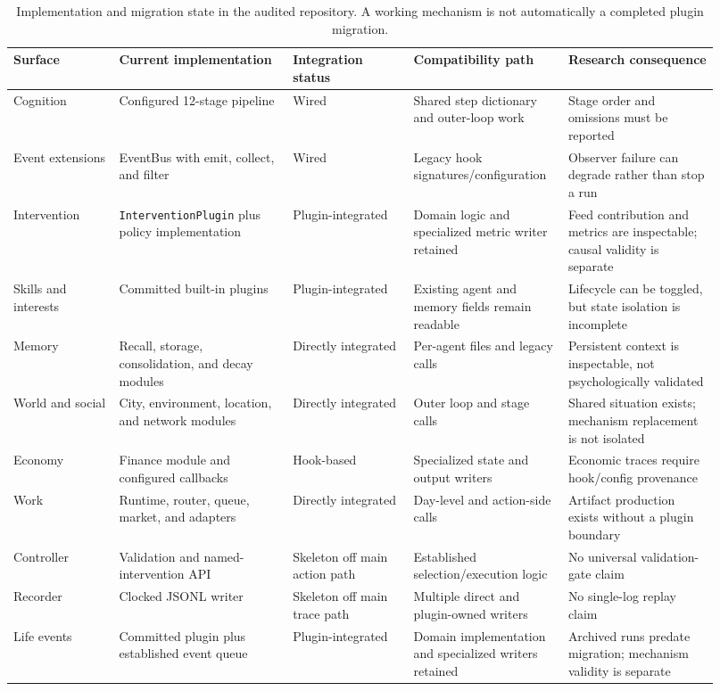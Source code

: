 \begin{table}[t]
\centering
\small
\setlength{\tabcolsep}{4pt}
\begin{tabular}{@{}p{0.14\linewidth}p{0.23\linewidth}p{0.16\linewidth}p{0.19\linewidth}p{0.20\linewidth}@{}}
\toprule
Surface & Current implementation & Integration status & Compatibility path & Research consequence \\
\midrule
Cognition & Configured 12-stage pipeline & Wired & Shared step dictionary and outer-loop work & Stage order and omissions must be reported \\
Event extensions & EventBus with emit, collect, and filter & Wired & Legacy hook signatures/configuration & Observer failure can degrade rather than stop a run \\
Intervention & \texttt{InterventionPlugin} plus policy implementation & Plugin-integrated & Domain logic and specialized metric writer retained & Feed contribution and metrics are inspectable; causal validity is separate \\
Skills and interests & Committed built-in plugins & Plugin-integrated & Existing agent and memory fields remain readable & Lifecycle can be toggled, but state isolation is incomplete \\
Memory & Recall, storage, consolidation, and decay modules & Directly integrated & Per-agent files and legacy calls & Persistent context is inspectable, not psychologically validated \\
World and social & City, environment, location, and network modules & Directly integrated & Outer loop and stage calls & Shared situation exists; mechanism replacement is not isolated \\
Economy & Finance module and configured callbacks & Hook-based & Specialized state and output writers & Economic traces require hook/config provenance \\
Work & Runtime, router, queue, market, and adapters & Directly integrated & Day-level and action-side calls & Artifact production exists without a plugin boundary \\
Controller & Validation and named-intervention API & Skeleton off main action path & Established selection/execution logic & No universal validation-gate claim \\
Recorder & Clocked JSONL writer & Skeleton off main trace path & Multiple direct and plugin-owned writers & No single-log replay claim \\
Life events & Committed plugin plus established event queue & Plugin-integrated & Domain implementation and specialized writers retained & Archived runs predate migration; mechanism validity is separate \\
\bottomrule
\end{tabular}
\caption{Implementation and migration state in the audited repository.  A
working mechanism is not automatically a completed plugin migration.}
\label{tab:migration-state}
\end{table}

